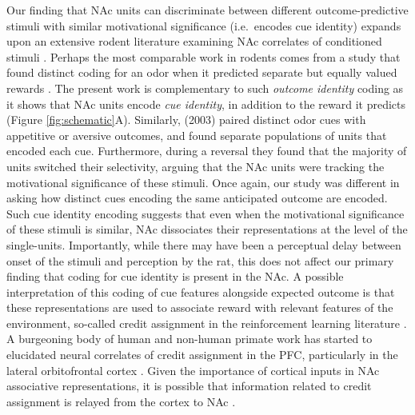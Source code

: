 \documentclass[11pt]{article}
\let\cite=\citep
\begin{document}
Our finding that NAc units can discriminate between different
outcome-predictive stimuli with similar motivational significance
(i.e.\ encodes cue identity) expands upon an extensive rodent
literature examining NAc correlates of conditioned stimuli
\cite{Setlow2003,Nicola2004,Yun2004,Roitman2005,Day2006,Ambroggi2008,Ishikawa2008,Roesch2009a,Saddoris2011,Goldstein2012,Lansink2012,Bissonette2013,McGinty2013,Atallah2014,Sugam2014,Cooch2015,West2016,Dejean2017}. Perhaps
the most comparable work in rodents comes from a study that found
distinct coding for an odor when it predicted separate but equally
valued rewards \cite{Cooch2015}. The present work is complementary to
such {\it outcome identity} coding as it shows that NAc units encode {\it cue
  identity}, in addition to the reward it
predicts (Figure \ref{fig:schematic}A). Similarly, \citeauthor{Setlow2003} (2003) paired distinct odor cues with appetitive or aversive outcomes, and found separate populations of units that encoded each cue. Furthermore, during a reversal they found that the majority of units switched their selectivity, arguing that the NAc units were tracking the motivational significance of these stimuli. Once again, our study was different in asking how distinct cues encoding the same anticipated outcome are encoded. Such cue identity encoding suggests that even when the motivational significance of these stimuli is similar, NAc dissociates their representations at the level of the single-units. Importantly, while there may have been a perceptual delay between onset of the stimuli and perception by the rat, this does not affect our primary finding that coding for cue identity is present in the NAc. A possible interpretation of this coding of cue
features alongside expected outcome is that these representations are
used to associate reward with relevant features of the environment,
so-called credit assignment in the reinforcement learning literature
\cite{sutton1998}. A burgeoning body of human and non-human primate
work has started to elucidated neural correlates of credit assignment
in the PFC, particularly in the lateral orbitofrontal cortex
\cite{Chau2015,Akaishi2016,Asaad2017,Noonan2017}. Given the importance
of cortical inputs in NAc associative representations, it is possible
that information related to credit assignment is relayed from the
cortex to NAc \cite{Ishikawa2008,Cooch2015}.
\end{document}
